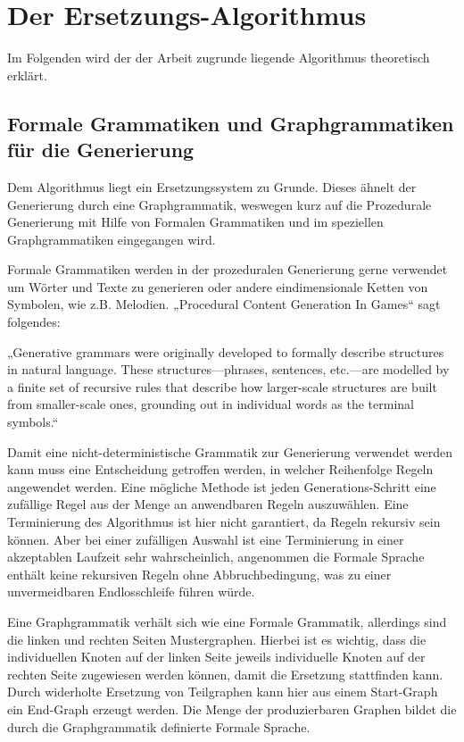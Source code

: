 \chapter{Der Ersetzungs-Algorithmus}

Im Folgenden wird der der Arbeit zugrunde liegende Algorithmus theoretisch erklärt.

\section{Formale Grammatiken und Graphgrammatiken für die Generierung}

Dem Algorithmus liegt ein Ersetzungssystem zu Grunde. Dieses ähnelt der Generierung durch eine Graphgrammatik, weswegen kurz auf die Prozedurale Generierung mit Hilfe von Formalen Grammatiken und im speziellen Graphgrammatiken eingegangen wird.

Formale Grammatiken werden in der prozeduralen Generierung gerne verwendet um Wörter und Texte zu generieren oder andere eindimensionale Ketten von Symbolen, wie z.B. Melodien. „Procedural Content Generation In Games“ sagt folgendes:

„Generative grammars were originally developed to formally describe structures in natural language. These structures—phrases, sentences, etc.—are modelled by a finite set of recursive rules that describe how larger-scale structures are built from smaller-scale ones, grounding out in individual words as the terminal symbols.“
\cite[Kap.~3.5, S.~45]{shaker2016procedural}

Damit eine nicht-deterministische Grammatik zur Generierung verwendet werden kann muss eine Entscheidung getroffen werden, in welcher Reihenfolge Regeln angewendet werden. Eine mögliche Methode ist jeden Generations-Schritt eine zufällige Regel aus der Menge an anwendbaren Regeln auszuwählen. 
\cite[Kap.~5.2, S.~75]{shaker2016procedural}
Eine Terminierung des Algorithmus ist hier nicht garantiert, da Regeln rekursiv sein können. Aber bei einer zufälligen Auswahl ist eine Terminierung in einer akzeptablen Laufzeit sehr wahrscheinlich, angenommen die Formale Sprache enthält keine rekursiven Regeln ohne Abbruchbedingung, was zu einer unvermeidbaren Endlosschleife führen würde.

Eine Graphgrammatik verhält sich wie eine Formale Grammatik, allerdings sind die linken und rechten Seiten Mustergraphen. Hierbei ist es wichtig, dass die individuellen Knoten auf der linken Seite jeweils individuelle Knoten auf der rechten Seite zugewiesen werden können, damit die Ersetzung stattfinden kann. 
\cite[Kap.~5.5.1, S.~80]{shaker2016procedural}
Durch widerholte Ersetzung von Teilgraphen kann hier aus einem Start-Graph ein End-Graph erzeugt werden. Die Menge der produzierbaren Graphen bildet die durch die Graphgrammatik definierte Formale Sprache. 

